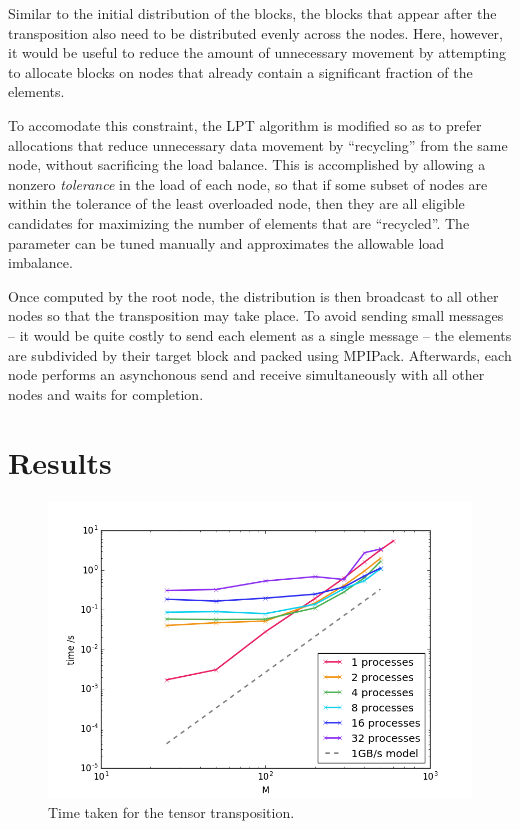 \documentclass[fleqn, 12pt]{article}
\begin{document}
Similar to the initial distribution of the blocks, the blocks that appear
after the transposition also need to be distributed evenly across the nodes.
Here, however, it would be useful to reduce the amount of unnecessary movement
by attempting to allocate blocks on nodes that already contain a significant
fraction of the elements.

To accomodate this constraint, the LPT algorithm is modified so as to prefer
allocations that reduce unnecessary data movement by ``recycling'' from the
same node, without sacrificing the load balance.  This is accomplished by
allowing a nonzero \textit{tolerance} in the load of each node, so that if
some subset of nodes are within the tolerance of the least overloaded node,
then they are all eligible candidates for maximizing the number of elements
that are ``recycled''.  The parameter can be tuned manually and approximates
the allowable load imbalance.

Once computed by the root node, the distribution is then broadcast to all
other nodes so that the transposition may take place.  To avoid sending small
messages -- it would be quite costly to send each element as a single message
-- the elements are subdivided by their target block and packed using
MPI\textunderscore Pack.  Afterwards, each node performs an asynchonous send
and receive simultaneously with all other nodes and waits for completion.

\section{Results}

\begin{figure}
\includegraphics[width=\textwidth]{figure}
\caption{Time taken for the tensor transposition.}
\label{fig:1}
\end{figure}
\end{document}
